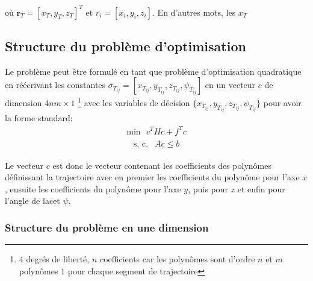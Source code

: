 \documentclass{article}
\begin{document}
où $\boldsymbol{r}_T = [x_T, y_T, z_T]^T$ et $r_i = [x_i, y_i, z_i]$. En d'autres mots, les $x_T$ 

\subsection{Structure du problème d'optimisation}

Le problème peut être formulé en tant que problème d'optimisation quadratique en réécrivant les constantes $\sigma_{T_{ij}} = [x_{T_{ij}}, y_{T_{ij}}, z_{T_{ij}}, \psi_{T_{ij}}]$ en un vecteur $c$ de dimension $4nm \times 1$ \footnote{$4$ degrés de liberté, $n$ coefficients car les polynômes sont d'ordre $n$ et $m$ polynômes $1$ pour chaque segment de trajectoire} avec les variables de décision $\{x_{T_{ij}}, y_{T_{ij}}, z_{T_{ij}}, \psi_{T_{ij}}\}$ pour avoir la forme standard:
\begin{align}\label{eq:opt_quad}
\text{min}\ \ \ c^THc+f^Tc
\end{align}\begin{align*}
	\begin{array}{ll}
	\text{s. c.} & Ac\leq b
	\end{array}
\end{align*}

Le vecteur $c$ est donc le vecteur contenant les coefficients des polynômes définissant la trajectoire avec en premier les coefficients du polynôme pour l'axe $x$, ensuite les coefficients du polynôme pour l'axe $y$, puis pour $z$ et enfin pour l'angle de lacet $\psi$.

\subsubsection{Structure du problème en une dimension}
\end{document}
